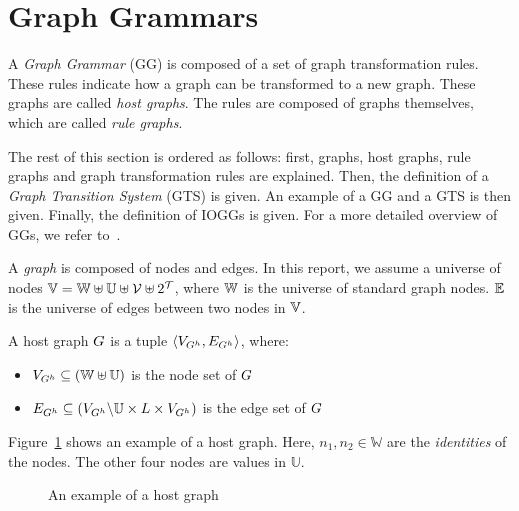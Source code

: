 \section{Graph Grammars}\label{sec:graph}
A \textit{Graph Grammar} (GG) is composed of a set of graph transformation rules. These rules indicate how a graph can be transformed to a new graph. These graphs are called \textit{host graphs}. The rules are composed of graphs themselves, which are called \textit{rule graphs}.

The rest of this section is ordered as follows: first, graphs, host graphs, rule graphs and graph transformation rules are explained. Then, the definition of a \textit{Graph Transition System} (GTS) is given. An example of a GG and a GTS is then given. Finally, the definition of IOGGs is given. For a more detailed overview of GGs, we refer to~\cite{Rensink:graph_grammars, Heckel2006187, Andries1999}.

\vspace{5px}
\begin{definition}
A \textit{graph} is composed of nodes and edges. In this report, we assume a universe of nodes $\mathbb{V} = \mathbb{W} \uplus \mathbb{U} \uplus \mathcal{V} \uplus 2^{\mathcal{T}}$, where $\mathbb{W}$ is the universe of standard graph nodes. $\mathbb{E}$ is the universe of edges between two nodes in $\mathbb{V}$.
\end{definition}

\vspace{5px}
\begin{definition}
A host graph $G$ is a tuple $\langle V_{G^h}, E_{G^h}\rangle$, where:
\begin{itemize}
  \item $V_{G^h} \subseteq (\mathbb{W} \uplus \mathbb{U})$ is the node set of $G$
  \item $E_{G^h} \subseteq (V_{G^h}\backslash\mathbb{U} \times L \times V_{G^h})$ is the edge set of $G$
\end{itemize}
\end{definition}
\vspace{5px}

Figure~\ref{fig:hostgraph_example} shows an example of a host graph. Here, $n_1, n_2 \in \mathbb{W}$ are the \textit{identities} of the nodes. The other four nodes are values in $\mathbb{U}$.

\begin{figure}[ht]
  \begin{center}
    
  \end{center}
  \caption{An example of a host graph}
  \label{fig:hostgraph_example}
\end{figure}


